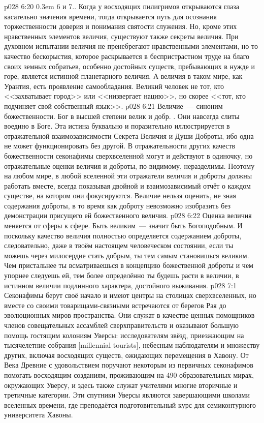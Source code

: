 \vs p028 6:20 \kern0.3em 6 и 7.\bibnobreakspace{}. Когда у восходящих пилигримов открываются глаза касательно значения времени, тогда открывается путь для осознания торжественности доверия и понимания святости служения. Но, кроме этих нравственных элементов величия, существуют также секреты величия. При духовном испытании величия не пренебрегают нравственными элементами, но то качество бескорыстия, которое раскрывается в беспристрастном труде на благо своих земных собратьев, особенно достойных существ, пребывающих в нужде и горе, является истинной  планетарного величия. А  величия в таком мире, как Урантия, есть проявление самообладания. Великий человек не тот, кто <<захватывает город>> или <<низвергает нацию>>, но скорее <<тот, кто подчиняет свой собственный язык>>.
\vs p028 6:21 Величие~--- синоним божественности. Бог в высшей степени велик и добр. . Они навсегда слиты воедино в Боге. Эта истина буквально и поразительно иллюстрируется в отражательной взаимозависимости Секрета Величия и Души Доброты, ибо одна не может функционировать без другой. В отражательности других качеств божественности секонафимы сверхвселенной могут и действуют в одиночку, но отражательные оценки величия и доброты, по\hyp{}видимому, неразделимы. Поэтому на любом мире, в любой вселенной эти отражатели величия и доброты должны работать вместе, всегда показывая двойной и взаимозависимый отчёт о каждом существе, на котором они фокусируются. Величие нельзя оценить, не зная содержания доброты, в то время как доброту невозможно изобразить без демонстрации присущего ей божественного величия.
\vs p028 6:22 Оценка величия меняется от сферы к сфере. Быть великим~--- значит быть Богоподобным. И поскольку качество величия полностью определяется содержанием доброты, следовательно, даже в твоём настоящем человеческом состоянии, если ты можешь через милосердие стать добрым, ты тем самым становишься великим. Чем пристальнее ты всматриваешься в концепцию божественной доброты и чем упорнее следуешь ей, тем более определённо ты будешь расти в величии, в истинном величии подлинного характера, достойного выживания.
\vs p028 7:1 Секонафимы берут своё начало и имеют центры на столицах сверхвселенных, но вместе со своими товарищами\hyp{}связными встречаются от берегов Рая до эволюционных миров пространства. Они служат в качестве ценных помощников членов совещательных ассамблей сверхправительств и оказывают большую помощь гостящим колониям Уверсы: исследователям звёзд, приезжающим на тысячелетние собрания [millennial tourists], небесным наблюдателям и множеству других, включая восходящих существ, ожидающих перемещения в Хавону. От Века Древние с удовольствием поручают некоторым из первичных секонафимов помогать восходящим созданиям, проживающим на 490 образовательных мирах, окружающих Уверсу, и здесь также служат учителями многие вторичные и третичные категории. Эти спутники Уверсы являются завершающими школами вселенных времени, где преподаётся подготовительный курс для семиконтурного университета Хавоны.
